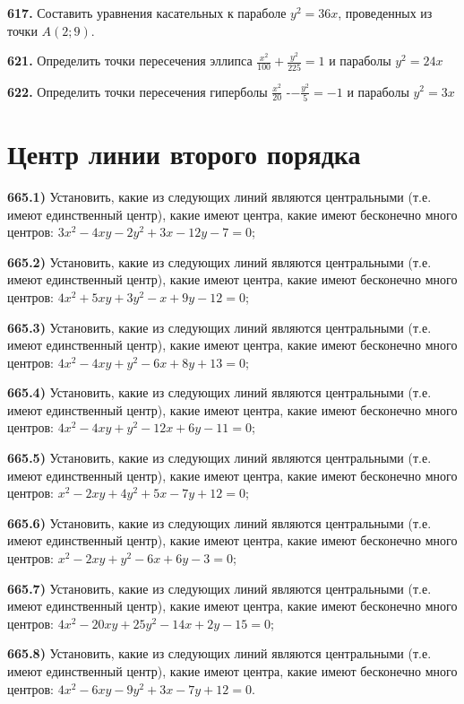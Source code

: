 \textbf{617.} Составить уравнения касательных к параболе $y^2=36 x$, проведенных из точки $A(2 ; 9)$.

\textbf{621.} Определить точки пересечения эллипса $\frac{x^2}{100}+\frac{y^2}{225}=1$ и параболы $y^2=24 x$

\textbf{622.} Определить точки пересечения гиперболы $\frac{x^2}{20}$ -$-\frac{y^2}{5}=-1$ и параболы $y^2=3 x$



\section{ Центр линии второго порядка }



\textbf{665.1)} Установить, какие из следующих линий являются центральными (т.е. имеют единственный центр), какие имеют центра, какие имеют бесконечно много центров: $3 x^2-4 x y-2 y^2+3 x-12 y-7=0$;

\textbf{665.2)} Установить, какие из следующих линий являются центральными (т.е. имеют единственный центр), какие имеют центра, какие имеют бесконечно много центров: $4 x^2+5 x y+3 y^2-x+9 y-12=0$;

\textbf{665.3)} Установить, какие из следующих линий являются центральными (т.е. имеют единственный центр), какие имеют центра, какие имеют бесконечно много центров: $4 x^2-4 x y+y^2-6 x+8 y+13=0$;

\textbf{665.4)} Установить, какие из следующих линий являются центральными (т.е. имеют единственный центр), какие имеют центра, какие имеют бесконечно много центров: $4 x^2-4 x y+y^2-12 x+6 y-11=0$;

\textbf{665.5)} Установить, какие из следующих линий являются центральными (т.е. имеют единственный центр), какие имеют центра, какие имеют бесконечно много центров: $x^2-2 x y+4 y^2+5 x-7 y+12=0$;

\textbf{665.6)} Установить, какие из следующих линий являются центральными (т.е. имеют единственный центр), какие имеют центра, какие имеют бесконечно много центров: $x^2-2 x y+y^2-6 x+6 y-3=0$;

\textbf{665.7)} Установить, какие из следующих линий являются центральными (т.е. имеют единственный центр), какие имеют центра, какие имеют бесконечно много центров: $4 x^2-20 x y+25 y^2-14 x+2 y-15=0$;

\textbf{665.8)} Установить, какие из следующих линий являются центральными (т.е. имеют единственный центр), какие имеют центра, какие имеют бесконечно много центров: $4 x^2-6 x y-9 y^2+3 x-7 y+12=0$.

